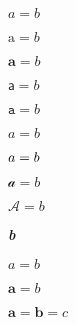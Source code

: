 \documentclass{article}
\begin{document}
\begin{example}
$a=b$
\end{example}

\begin{example}
$\mathrm{a} = b$
\end{example}

\begin{example}
$\mathbf{a} = b$
\end{example}

\begin{example}
$\mathsf{a} = b$
\end{example}

\begin{example}
$\mathtt{a} = b$
\end{example}

\begin{example}
$\mathit{a} = b$
\end{example}

\begin{example}
$\mathnormal{a} = b$
\end{example}

\begin{example}
$\mathcal{a} = b$
\end{example}

\begin{example}
$\mathcal{A} = b$
\end{example}



\begin{example}
\textbf{\textit{b}}
\end{example}



\begin{example}
$\mathbf{\mathit{a}} = b$
\end{example}


\begin{example}
$\mathbf a = b$
\end{example}


\begin{example}
$\mathbf{a = b} =c$
\end{example}

\end{document}
